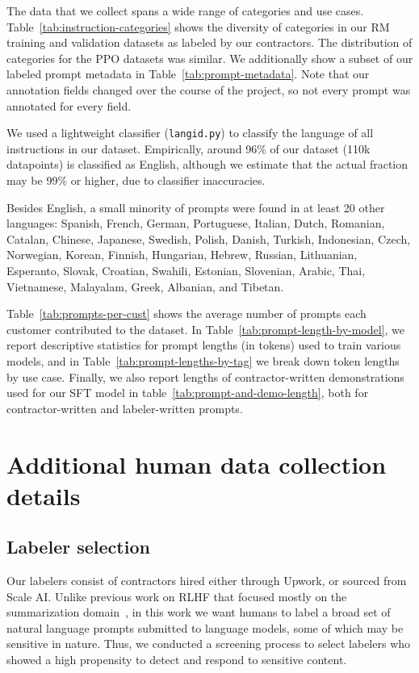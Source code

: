 The data that we collect spans a wide range of categories and use cases. Table~\ref{tab:instruction-categories} shows the diversity of categories in our RM training and validation datasets as labeled by our contractors. The distribution of categories for the PPO datasets was similar.
We additionally show a subset of our labeled prompt metadata in Table~\ref{tab:prompt-metadata}. 
Note that our annotation fields changed over the course of the project, so not every prompt was annotated for every field.   

We used a lightweight classifier (\texttt{langid.py}) to classify the language of all instructions in our dataset.
Empirically, around 96\% of our dataset (110k datapoints) is classified as English, although we estimate that the actual fraction may be 99\% or higher, due to classifier inaccuracies.

Besides English, a small minority of prompts were found in at least 20 other languages:
Spanish, French, German, Portuguese, Italian, Dutch, Romanian, Catalan, Chinese, Japanese, Swedish, Polish, Danish, Turkish, Indonesian, Czech, Norwegian, Korean, Finnish, Hungarian, Hebrew, Russian, Lithuanian, Esperanto, Slovak, Croatian, Swahili, Estonian, Slovenian, Arabic, Thai, Vietnamese, Malayalam, Greek, Albanian, and Tibetan.

Table~\ref{tab:prompts-per-cust} shows the average number of prompts each customer contributed to the dataset. In Table~\ref{tab:prompt-length-by-model}, we report descriptive statistics for prompt lengths (in tokens) used to train various models, and in Table~\ref{tab:prompt-lengths-by-tag} we  break down token lengths by use case. Finally, we also report lengths of contractor-written demonstrations used for our SFT model in table~\ref{tab:prompt-and-demo-length}, both for contractor-written and labeler-written prompts.


\newpage
\section{Additional human data collection details}
\label{apdx:human-data}


\subsection{Labeler selection}
\label{apdx:human-data:selection}

Our labelers consist of contractors hired either through Upwork, or sourced from Scale AI. Unlike previous work on RLHF that focused mostly on the summarization domain~\cite{ziegler2019fine,stiennon2020learning,wu2021recursively}, in this work we want humans to label a broad set of natural language prompts submitted to language models, some of which may be sensitive in nature. Thus, we conducted a screening process to select labelers who showed a high propensity to detect and respond to sensitive content.

